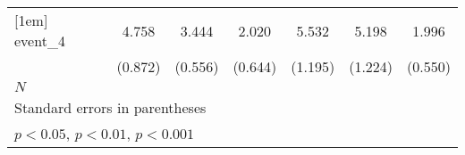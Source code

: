 {\begin{tabular}{l*{6}{c}}
[1em]
event\_4     &       4.758\sym{***}&       3.444\sym{***}&       2.020\sym{**} &       5.532\sym{***}&       5.198\sym{***}&       1.996\sym{***}\\
            &     (0.872)         &     (0.556)         &     (0.644)         &     (1.195)         &     (1.224)         &     (0.550)         \\
\hline
\(N\)       &                     &                     &                     &                     &                     &                     \\
\hline\hline
\multicolumn{7}{l}{\footnotesize Standard errors in parentheses}\\
\multicolumn{7}{l}{\footnotesize \sym{*} \(p<0.05\), \sym{**} \(p<0.01\), \sym{***} \(p<0.001\)}\\
\end{tabular}
}
